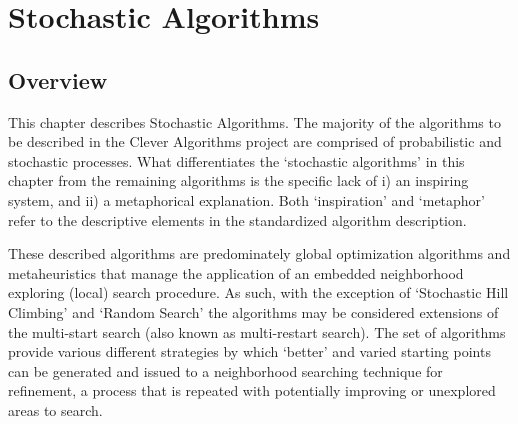 

\renewcommand{\bibsection}{\subsection{\bibname}}

\chapter{Stochastic Algorithms}
\label{ch:stochastic}

% 
% 
\section{Overview}
This chapter describes Stochastic Algorithms.
The majority of the algorithms to be described in the Clever Algorithms project are comprised of probabilistic and stochastic processes. What differentiates the `stochastic algorithms' in this chapter from the remaining algorithms is the specific lack of i) an inspiring system, and ii) a metaphorical explanation. Both `inspiration' and `metaphor' refer to the descriptive elements in the standardized algorithm description.

These described algorithms are predominately global optimization algorithms and metaheuristics that manage the application of an embedded neighborhood exploring (local) search procedure. As such, with the exception of `Stochastic Hill Climbing' and `Random Search' the algorithms may be considered extensions of the multi-start search (also known as multi-restart search). The set of algorithms provide various different strategies by which `better' and varied starting points can be generated and issued to a neighborhood searching technique for refinement, a process that is repeated with potentially improving or unexplored areas to search. 


% 
% 
% 

